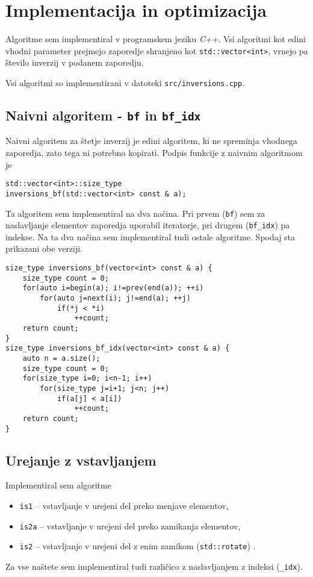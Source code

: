 \documentclass[11pt,a4paper]{article}
\theoremstyle{plain}
\theoremstyle{definition}
\begin{document}
\section{Implementacija in optimizacija}

Algoritme sem implementiral v programskem jeziku \emph{C++}. Vsi algoritmi kot edini vhodni parameter prejmejo zaporedje shranjeno kot \lstinline!std::vector<int>!, vrnejo pa število inverzij v podanem zaporedju.

Vsi algoritmi so implementirani v datoteki \lstinline!src/inversions.cpp!.

\subsection{Naivni algoritem - \lstinline!bf! in \lstinline!bf_idx!}

Naivni algoritem za štetje inverzij je edini algoritem, ki ne spreminja vhodnega zaporedja, zato tega ni potrebno kopirati. Podpis funkcije z naivnim algoritmom je
\begin{lstlisting}
std::vector<int>::size_type
inversions_bf(std::vector<int> const & a);
\end{lstlisting}

Ta algoritem sem implementiral na dva načina. Pri prvem (\lstinline!bf!) sem za naslavljanje elementov zaporedja uporabil iteratorje, pri drugem (\lstinline!bf_idx!) pa indekse. Na ta dva načina sem implementiral tudi ostale algoritme. Spodaj sta prikazani obe verziji.
\begin{lstlisting}
size_type inversions_bf(vector<int> const & a) {
    size_type count = 0;
    for(auto i=begin(a); i!=prev(end(a)); ++i)
        for(auto j=next(i); j!=end(a); ++j)
            if(*j < *i)
                ++count;
    return count;
}
size_type inversions_bf_idx(vector<int> const & a) {
    auto n = a.size();
    size_type count = 0;
    for(size_type i=0; i<n-1; i++)
        for(size_type j=i+1; j<n; j++)
            if(a[j] < a[i])
                ++count;
    return count;
}
\end{lstlisting}

\subsection{Urejanje z vstavljanjem}

Implementiral sem algoritme
\begin{itemize}
\item
\lstinline!is1! -- vstavljanje v urejeni del preko menjave elementov,
\item
\lstinline!is2a! -- vstavljanje v urejeni del preko zamikanja elementov,
\item
\lstinline!is2! -- vstavljanje v urejeni del z enim zamikom (\lstinline!std::rotate!) .
\end{itemize}
Za vse naštete sem implementiral tudi različico z naslavljanjem z indeksi (\lstinline!_idx!).
\end{document}
